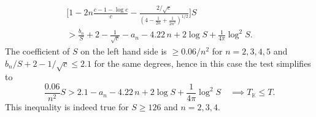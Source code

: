 \documentclass[a4paper,11pt]{amsart}
\newcommand{\field}[1]{\mathbb{{#1}}}
\newcommand{\K}{\field{{K}}}
\theoremstyle{remark}
\begin{document}
%
\begin{multline*}
\Big[1 - 2n\frac{c-1-\log c}{c} - \frac{2/\sqrt{c}}{(4{-}\frac{1}{2n}{+}\frac{1}{2n^2})^{1/2}}\Big] S\\
>  \frac{b_n}{S} + 2 - \frac{1}{\sqrt{c}} - a_n - 4.22\,n + 2\log S + \frac{1}{4\pi}\log^2S.
\end{multline*}
%
The coefficient of $S$ on the left hand side is $\geq 0.06/n^2$ for $n=2,3,4,5$
%
%
and $b_n/S + 2 - 1/\sqrt{c} \leq 2.1$ for the same degrees, hence in this case the test simplifies to
%
\[
\frac{0.06}{n^2} S
> 2.1 - a_n - 4.22\,n + 2\log S + \frac{1}{4\pi}\log^2 S
\quad
\implies T_\K \leq T.
\]
%
This inequality is indeed true for $S\geq 126$ and $n=2,3,4$.
%
\end{document}
